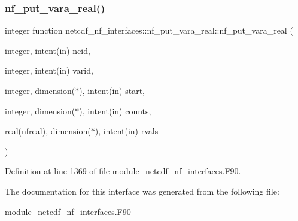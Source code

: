 \subsubsection{\texorpdfstring{nf\+\_\+put\+\_\+vara\+\_\+real()}{nf\_put\_vara\_real()}}
{\footnotesize\ttfamily integer function netcdf\+\_\+nf\+\_\+interfaces\+::nf\+\_\+put\+\_\+vara\+\_\+real\+::nf\+\_\+put\+\_\+vara\+\_\+real (\begin{DoxyParamCaption}\item[{integer, intent(in)}]{ncid,  }\item[{integer, intent(in)}]{varid,  }\item[{integer, dimension($\ast$), intent(in)}]{start,  }\item[{integer, dimension($\ast$), intent(in)}]{counts,  }\item[{real(nfreal), dimension($\ast$), intent(in)}]{rvals }\end{DoxyParamCaption})}



Definition at line 1369 of file module\+\_\+netcdf\+\_\+nf\+\_\+interfaces.\+F90.



The documentation for this interface was generated from the following file\+:\begin{DoxyCompactItemize}
\item 
\hyperlink{module__netcdf__nf__interfaces_8F90}{module\+\_\+netcdf\+\_\+nf\+\_\+interfaces.\+F90}\end{DoxyCompactItemize}
